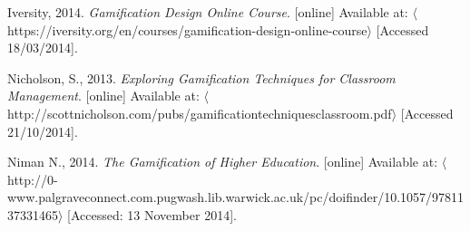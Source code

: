 \documentclass[10pt,a4paper]{report}
\begin{document}
\noindent Iversity, 2014. \textit{Gamification Design Online Course}. [online] Available at: $\langle$https://iversity.org/en/courses/gamification-design-online-course$\rangle$ [Accessed 18/03/2014].
\newline

\noindent Nicholson, S., 2013. \textit{Exploring Gamification Techniques for Classroom Management}. [online] Available at: $\langle$http://scottnicholson.com/pubs/gamificationtechniquesclassroom.pdf$\rangle$ [Accessed 21/10/2014].
\newline

\noindent Niman N., 2014. \textit{The Gamification of Higher Education}. [online] Available at: $\langle$http://0-www.palgraveconnect.com.pugwash.lib.warwick.ac.uk/pc/doifinder/10.1057/9781137331465$\rangle$ [Accessed: 13 November 2014].
\end{document}
